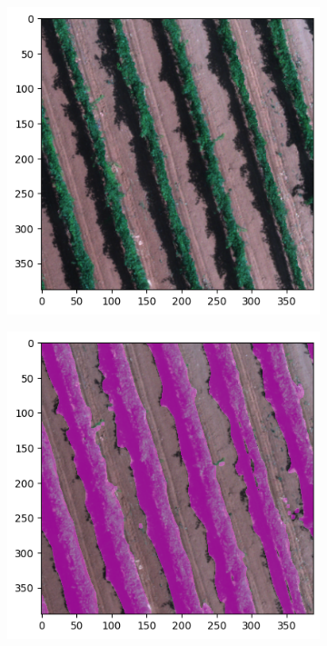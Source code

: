 \documentclass[comsoc,final]{IEEEtran}
\begin{document}
\begin{figure}{\centering%
%
      \begin{subfigure}[b]{0.45\columnwidth}
         \centering
         \includegraphics[width=\columnwidth]{vite}
         \caption{}
         \label{maskplot:a}
     \end{subfigure}%
%
     \begin{subfigure}[b]{0.45\columnwidth}
         \centering
         \includegraphics[width=\columnwidth]{vite_GT}

\end{subfigure}}
\end{figure}
\end{document}
